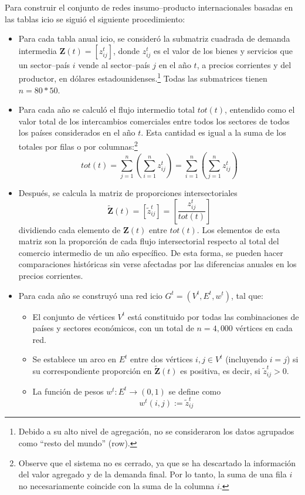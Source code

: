 Para construir el conjunto de redes insumo--producto internacionales basadas en las tablas \gls{icio} se siguió el siguiente procedimiento:
\begin{itemize}
    \item Para cada tabla anual \gls{icio}, se consideró la submatriz cuadrada de demanda intermedia $\textbf{Z}(t)=\left[z_{ij}^t \right]$, donde $z_{ij}^t$ es el valor de los bienes y servicios que un sector--país $i$ vende al sector--país $j$ en el año $t$, a precios corrientes y del productor, en dólares estadounidenses.\footnote{Debido a su alto nivel de agregación, no se consideraron los datos agrupados como ``resto del mundo'' (\gls{row}).} Todas las submatrices tienen $n=80*50$.
    \item Para cada año se calculó el flujo  intermedio total $tot(t)$, entendido como el valor total de los intercambios comerciales entre todos los sectores de todos los países considerados en el año $t$. Esta cantidad es igual a la suma de los totales por filas o por columnas:\footnote{Observe que el sistema no es cerrado, ya que se ha descartado la información del valor agregado y de la demanda final. Por lo tanto, la suma de una fila $i$  no necesariamente coincide con la suma de la columna $i$.}
    \begin{equation}
    	tot(t) = \sum_{j=1}^{n} \left(\sum_{i=1}^{n} z_{ij}^t\right)= \sum_{i=1}^{n} \left(\sum_{j=1}^{n} z_{ij}^t\right)
    \end{equation}
    \item Después, se calcula la matriz de proporciones intersectoriales
	 \begin{equation}
	 	\tilde{\textbf{Z}}(t) =\left[ \tilde{z}^t_{ij}\right] = \left[\frac{z^t_{ij}}{tot(t)}\right]
	 \end{equation}
    dividiendo cada elemento de $\textbf{Z}(t)$ entre $tot(t)$. Los elementos de esta matriz son la proporción de cada flujo intersectorial respecto al total del comercio intermedio de un año específico. De esta forma, se pueden hacer comparaciones históricas sin verse afectadas por las diferencias anuales en los precios corrientes.
    \item Para cada año se construyó una red \gls{icio} $G^{t}=(V^{t}, E^{t}, w^{t})$, tal que:
    \begin{itemize}
        \item El conjunto de vértices $V^{t}$ está constituido por todas las combinaciones de países y sectores económicos, con un total de $n=4,000$ vértices en cada red.
        \item Se establece un arco en $E^{t}$ entre dos vértices $i,j\in V^t$ (incluyendo $i=j$) si su correspondiente proporción en $\tilde{\textbf{Z}}(t)$ es positiva, es decir, si $\tilde{z}^t_{ij}>0$. %
        \item La función de pesos $w^t : E^t \rightarrow (0,1)$
        se define como
     	\begin{equation}
        	w^t(i,j) := \tilde{z}^t_{ij}
     	\end{equation}
    \end{itemize} 
\end{itemize}

